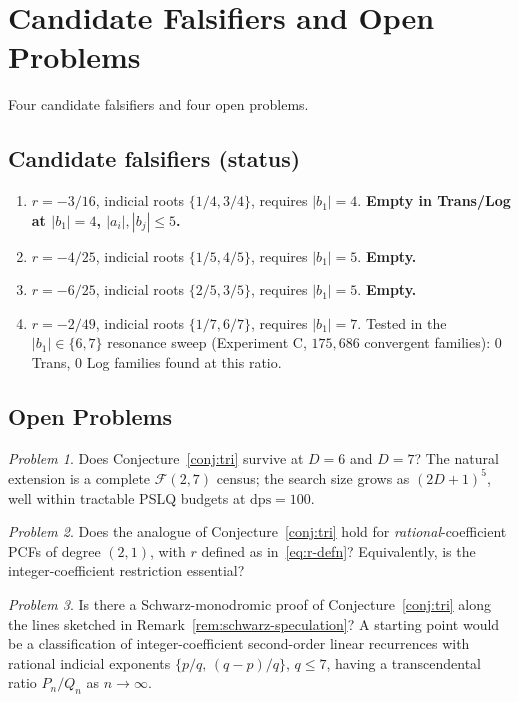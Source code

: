 \documentclass[11pt]{amsart}
\theoremstyle{definition}
\theoremstyle{remark}
\newtheorem{problem}{Problem}
\newcommand{\FF}{\mathcal{F}}
\newcommand{\dps}{\mathrm{dps}}
\begin{document}
\section{Candidate Falsifiers and Open Problems}\label{sec:open}

Four candidate falsifiers and four open problems.

\subsection*{Candidate falsifiers (status)}
\begin{enumerate}[label={\upshape(\arabic*)}]
\item $r = -3/16$, indicial roots $\{1/4, 3/4\}$, requires $|b_1| = 4$.
\textbf{Empty in Trans/Log at $|b_1| = 4$, $|a_i|, |b_j| \le 5$.}
\item $r = -4/25$, indicial roots $\{1/5, 4/5\}$, requires
$|b_1| = 5$. \textbf{Empty.}
\item $r = -6/25$, indicial roots $\{2/5, 3/5\}$, requires
$|b_1| = 5$. \textbf{Empty.}
\item $r = -2/49$, indicial roots $\{1/7, 6/7\}$, requires
$|b_1| = 7$.  Tested in the $|b_1| \in \{6,7\}$ resonance sweep
(Experiment C, $175{,}686$ convergent families): $0$ Trans,
$0$ Log families found at this ratio.
\end{enumerate}

\subsection*{Open Problems}
\begin{problem}\label{prob:d6}
Does Conjecture~\ref{conj:tri} survive at $D = 6$ and $D = 7$?
The natural extension is a complete $\FF(2,7)$ census; the search
size grows as $(2D{+}1)^5$, well within tractable PSLQ budgets at
$\dps = 100$.
\end{problem}

\begin{problem}\label{prob:rational-coeffs}
Does the analogue of Conjecture~\ref{conj:tri} hold for
\emph{rational}-coefficient PCFs of degree $(2,1)$, with $r$ defined
as in~\eqref{eq:r-defn}?  Equivalently, is the integer-coefficient
restriction essential?
\end{problem}

\begin{problem}\label{prob:schwarz}
Is there a Schwarz-monodromic proof of Conjecture~\ref{conj:tri}
along the lines sketched in Remark~\ref{rem:schwarz-speculation}?
A starting point would be a classification of integer-coefficient
second-order linear recurrences with rational indicial exponents
$\{p/q,\,(q-p)/q\}$, $q \le 7$, having a transcendental ratio
$P_n/Q_n$ as $n \to \infty$.
\end{problem}
\end{document}
